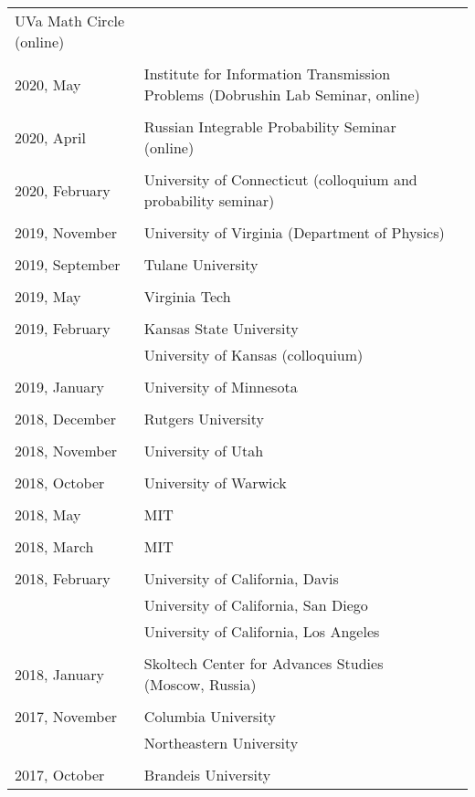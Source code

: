 \documentclass[letterpaper,11pt]{article}
\begin{document}
\begin{longtable}{llc}
	UVa Math Circle (online)
	\\\\
	2020, May
	& Institute for Information Transmission Problems
	(Dobrushin Lab Seminar, online)
	\\\\
	2020, April
	& Russian Integrable Probability Seminar (online)
	\\\\
	2020, February
	& University of Connecticut (colloquium and probability seminar)
	\\\\
	2019, November
	& University of Virginia (Department of Physics)
	\\\\
	2019, September
	& Tulane University
	\\\\
	2019, May
	& Virginia Tech
	\\\\
	2019, February
	& Kansas State University \\
	& University of Kansas (colloquium)
	\\\\
	2019, January
	& University of Minnesota
	\\\\
	2018, December
	& Rutgers University
	\\\\
	2018, November
	& University of Utah
	\\\\
	2018, October
	& University of Warwick
	\\\\
	2018, May
	& MIT
	\\\\
	2018, March
	& MIT
	\\\\
	2018, February 
	& University of California, Davis
	\\
	& University of California, San Diego
	\\
	& University of California, Los Angeles
	\\\\
	2018, January
	& Skoltech Center for Advances Studies (Moscow, Russia)
	\\\\
	2017, November
	& Columbia University
	\\
	& Northeastern University
	\\\\
	2017, October
	& Brandeis University

\end{longtable}
\end{document}
